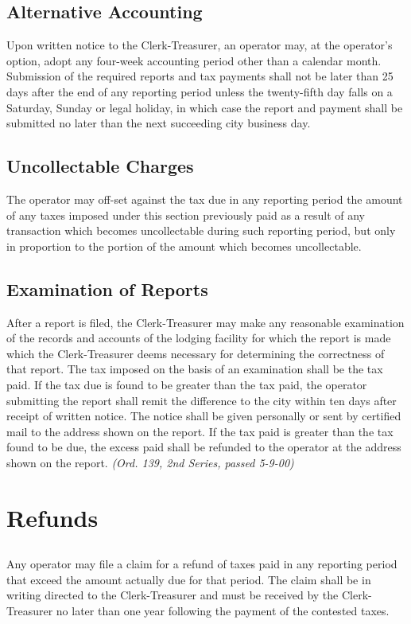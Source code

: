 \subsection{Alternative Accounting}
Upon written notice to the Clerk-Treasurer, an operator may, at the operator’s option, adopt any four-week accounting period other than a calendar month.  Submission of the required reports and tax payments shall not be later than 25 days after the end of any reporting period unless the twenty-fifth day falls on a Saturday, Sunday or legal holiday, in which case the report and payment shall be submitted no later than the next succeeding city business day.
\subsection{Uncollectable Charges}
The operator may off-set against the tax due in any reporting period the amount of any taxes imposed under this section previously paid as a result of any transaction which becomes uncollectable during such reporting period, but only in proportion to the portion of the amount which becomes uncollectable.
\subsection{Examination of Reports}
After a report is filed, the Clerk-Treasurer may make any reasonable examination of the records and accounts of the lodging facility for which the report is made which the Clerk-Treasurer deems necessary for determining the correctness of that report. The tax imposed on the basis of an examination shall be the tax paid. If the tax due is found to be greater than the tax paid, the operator submitting the report shall remit the difference to the city within ten days after receipt of written notice. The notice shall be given personally or sent by certified mail to the address shown on the report. If the tax paid is greater than the tax found to be due, the excess paid shall be refunded to the operator at the address shown on the report.\newline
\emph{(Ord. 139, 2nd Series, passed 5-9-00)}

\section{Refunds}
\subsection{}
Any operator may file a claim for a refund of taxes paid in any reporting period that exceed the amount actually due for that period. The claim shall be in writing directed to the Clerk-Treasurer and must be received by the Clerk-Treasurer no later than one year following the payment of the contested taxes.
